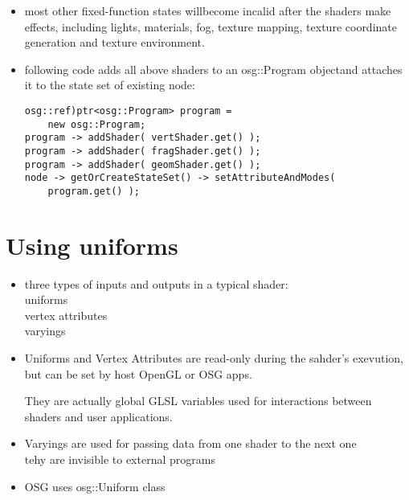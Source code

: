 \documentclass[a4paper,12pt]{book}
\begin{document}
\begin{itemize}
\item most other fixed-function states willbecome incalid after the shaders make effects, including lights, materials, fog, texture mapping, texture coordinate generation and texture environment.\\

\item following code adds all above shaders to an osg::Program objectand attaches it to the state set of existing node:

\begin{lstlisting}
osg::ref)ptr<osg::Program> program =
	new osg::Program;
program -> addShader( vertShader.get() );
program -> addShader( fragShader.get() );
program -> addShader( geomShader.get() );
node -> getOrCreateStateSet() -> setAttributeAndModes(
	program.get() );
\end{lstlisting}

\end{itemize}

\section{Using uniforms}

\begin{itemize}
\item three types of inputs and outputs in a typical shader:\\
\textrightarrow uniforms\\
\textrightarrow vertex attributes\\
\textrightarrow varyings\\

\item Uniforms and Vertex Attributes are read-only during the sahder's exevution, but can be set by host OpenGL or OSG apps.

\textrightarrow They are actually global GLSL variables used for interactions between shaders and user applications.\\

\item Varyings are used for passing data from one shader to the next one\\
\textrightarrow tehy are invisible to external programs\\
\item OSG uses osg::Uniform class
\end{itemize}
\end{document}

